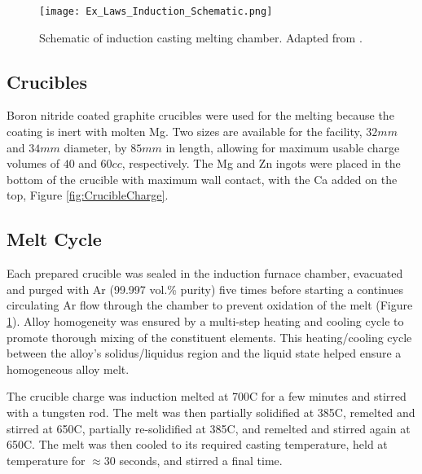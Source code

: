 \begin{figure}[htbp]
	\centering
	\texttt{[image: Ex\_Laws\_Induction\_Schematic.png]}
	\caption[Schematic of induction casting melting chamber.]{Schematic of induction casting melting chamber. Adapted from \cite{Laws2007}.}
	\label{fig:CastingSchematic}
\end{figure}

\subsection{Crucibles}

Boron nitride coated graphite crucibles were used for the melting because the coating is inert with molten Mg. Two sizes are available for the facility, $32 mm$ and $34 mm$ diameter, by $85 mm$ in length, allowing for maximum usable charge volumes of $40$ and $60 cc$, respectively. The Mg and Zn ingots were placed in the bottom of the crucible with maximum wall contact, with the Ca added on the top, Figure \ref{fig:CrucibleCharge}.

\subsection{Melt Cycle}

Each prepared crucible was sealed in the induction furnace chamber, evacuated and purged with Ar (99.997 vol.\% purity) five times before starting a continues circulating Ar flow through the chamber to prevent oxidation of the melt (Figure \ref{fig:CastingSchematic}). Alloy homogeneity was ensured by a multi-step heating and cooling cycle to promote thorough mixing of the constituent elements. This heating/cooling cycle between the alloy's solidus/liquidus region and the liquid state helped ensure a homogeneous alloy melt.

The crucible charge was induction melted at 700\degree C for a few minutes and stirred with a tungsten rod. The melt was then partially solidified at 385\degree C, remelted and stirred at 650\degree C, partially re-solidified at 385\degree C, and remelted and stirred again at 650\degree C. The melt was then cooled to its required casting temperature, held at temperature for ${\approx} 30$ seconds, and stirred a final time.

